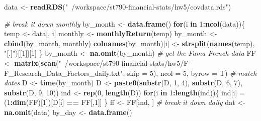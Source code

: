 \documentclass[11pt,]{article}
\newenvironment{Shaded}{\begin{snugshade}}{\end{snugshade}}
\newcommand{\CommentTok}[1]{\textcolor[rgb]{0.56,0.35,0.01}{\textit{#1}}}
\newcommand{\ControlFlowTok}[1]{\textcolor[rgb]{0.13,0.29,0.53}{\textbf{#1}}}
\newcommand{\DataTypeTok}[1]{\textcolor[rgb]{0.13,0.29,0.53}{#1}}
\newcommand{\DecValTok}[1]{\textcolor[rgb]{0.00,0.00,0.81}{#1}}
\newcommand{\KeywordTok}[1]{\textcolor[rgb]{0.13,0.29,0.53}{\textbf{#1}}}
\newcommand{\NormalTok}[1]{#1}
\newcommand{\OperatorTok}[1]{\textcolor[rgb]{0.81,0.36,0.00}{\textbf{#1}}}
\newcommand{\StringTok}[1]{\textcolor[rgb]{0.31,0.60,0.02}{#1}}
\begin{document}
\begin{Shaded}
\begin{Highlighting}[]
\NormalTok{data <-}\StringTok{ }\KeywordTok{readRDS}\NormalTok{(}\StringTok{"~/workspace/st790-financial-stats/hw5/covdata.rds"}\NormalTok{)}

\CommentTok{# break it down monthly }
\NormalTok{by_month <-}\StringTok{ }\KeywordTok{data.frame}\NormalTok{() }
\ControlFlowTok{for}\NormalTok{(i }\ControlFlowTok{in} \DecValTok{1}\OperatorTok{:}\KeywordTok{ncol}\NormalTok{(data))\{}
\NormalTok{  temp <-}\StringTok{ }\NormalTok{data[, i]}
\NormalTok{  monthly <-}\StringTok{ }\KeywordTok{monthlyReturn}\NormalTok{(temp)}
\NormalTok{  by_month <-}\StringTok{ }\KeywordTok{cbind}\NormalTok{(by_month, monthly)}
  \KeywordTok{colnames}\NormalTok{(by_month)[i] <-}\StringTok{ }\KeywordTok{strsplit}\NormalTok{(}\KeywordTok{names}\NormalTok{(temp), }\StringTok{"[.]"}\NormalTok{)[[}\DecValTok{1}\NormalTok{]][}\DecValTok{1}\NormalTok{]}
\NormalTok{\}}
\NormalTok{by_month <-}\StringTok{ }\KeywordTok{na.omit}\NormalTok{(by_month)}
\CommentTok{# get the Fama French data }
\NormalTok{FF <-}\StringTok{ }\KeywordTok{matrix}\NormalTok{(}\KeywordTok{scan}\NormalTok{(}\StringTok{"~/workspace/st790-financial-stats/hw5/F-F_Research_Data_Factors_daily.txt"}\NormalTok{, }\DataTypeTok{skip =} \DecValTok{5}\NormalTok{), }\DataTypeTok{ncol =} \DecValTok{5}\NormalTok{, }\DataTypeTok{byrow =}\NormalTok{ T)}
\CommentTok{# match dates }
\NormalTok{D <-}\StringTok{ }\KeywordTok{time}\NormalTok{(by_month)}
\NormalTok{D <-}\StringTok{ }\KeywordTok{paste0}\NormalTok{(}\KeywordTok{substr}\NormalTok{(D, }\DecValTok{1}\NormalTok{, }\DecValTok{4}\NormalTok{),}
            \KeywordTok{substr}\NormalTok{(D, }\DecValTok{6}\NormalTok{, }\DecValTok{7}\NormalTok{), }
            \KeywordTok{substr}\NormalTok{(D, }\DecValTok{9}\NormalTok{, }\DecValTok{10}\NormalTok{))}
\NormalTok{ind <-}\StringTok{ }\KeywordTok{rep}\NormalTok{(}\DecValTok{0}\NormalTok{, }\KeywordTok{length}\NormalTok{(D))}
\ControlFlowTok{for}\NormalTok{(i }\ControlFlowTok{in} \DecValTok{1}\OperatorTok{:}\KeywordTok{length}\NormalTok{(ind))\{}
\NormalTok{  ind[i] =}\StringTok{ }\NormalTok{(}\DecValTok{1}\OperatorTok{:}\KeywordTok{dim}\NormalTok{(FF)[}\DecValTok{1}\NormalTok{])[D[i] }\OperatorTok{==}\StringTok{ }\NormalTok{FF[,}\DecValTok{1}\NormalTok{]]}
\NormalTok{\}}
\NormalTok{ff <-}\StringTok{ }\NormalTok{FF[ind, ]}
\CommentTok{# break it down daily  }
\NormalTok{dat <-}\StringTok{ }\KeywordTok{na.omit}\NormalTok{(data)}
\NormalTok{by_day <-}\StringTok{ }\KeywordTok{data.frame}\NormalTok{() }

\end{Highlighting}
\end{Shaded}
\end{document}
